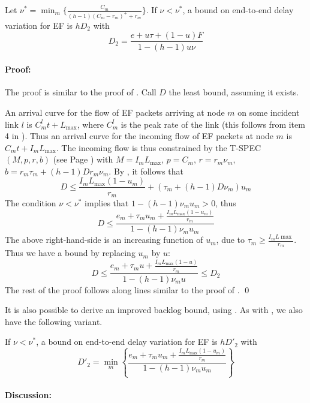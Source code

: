 \begin{theorem} Let
$\nu^*=\min_m\{\frac{C_m}{(h-1)(C_m-r_m)^+ + r_m}\}$. If $\nu <
\nu^*$, a bound on end-to-end delay variation for EF is $h D_2$
with
$$
D_2 = \frac{e +  u \tau + (1-u) F }{1-(h-1) u \nu}
$$
\end{theorem}
\paragraph{Proof: }

The proof is similar to the proof of . Call
$D$ the least bound, assuming it exists.

An arrival curve for the flow of EF packets arriving at node $m$
on some incident link $l$ is $C^l_m t + L_{\max}$, where $C^l_m$
is the peak rate of the link (this follows from item 4 in
). Thus an arrival curve for the incoming flow
of EF packets at node $m$ is $C_m t + I_m L_{\max}$. The incoming
flow is thus constrained by the T-SPEC $(M,p, r,b)$ (see Page
\pageref{eq-tspec}) with $M=I_m L_{\max}$, $p=C_m$, $r=r_m \nu_m$,
$b=r_m \tau_m + (h-1)D r_m \nu_m$. By , it
follows that
$$
D \leq \frac{I_m L_{\max}  (1-u_m)}{r_m} + (\tau_m + (h-1)D \nu_m)
u_m
$$
The condition $\nu < \nu^*$ implies that $1- (h-1) \nu_m u_m >0$,
thus
$$
D \leq  \frac{e_m + \tau_m u_m + \frac{I_m L_{\max}
(1-u_m)}{r_m}}{1- (h-1) \nu_m u_m  }
$$
The above right-hand-side is an increasing function of $u_m$, due
to $\tau_m \geq \frac{I_m L{\max}}{r_m}$. Thus we have a bound by
replacing $u_m$ by $u$:
$$
D \leq \frac{e_m + \tau_m u  + \frac{I_m L_{\max} (1-u )}{r_m}}{1-
(h-1) \nu_m u}
 \leq D_2
$$
The rest of the proof follows along lines similar to the proof of
. \qed


It is also possible to derive an improved backlog bound, using
. As with , we also
have the following variant.
\begin{corollary}
If $\nu < \nu^*$, a bound on end-to-end delay variation for EF is
$h D'_2$ with
$$
D'_2 = \min_m\left\{ \frac{e_m + \tau_m u_m + \frac{I_m L_{\max}
(1-u_m)}{r_m}}{1- (h-1) \nu_m u_m  } \right\}
$$
\end{corollary}


\paragraph{Discussion:}

